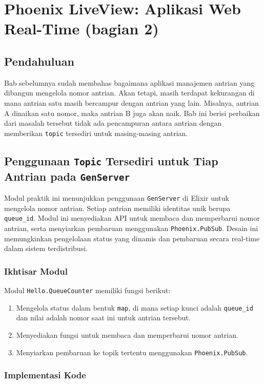 \chapter{Phoenix LiveView: Aplikasi Web Real-Time (bagian 2)}

\section{Pendahuluan}

Bab sebelumnya sudah membahas bagaimana aplikasi manajemen antrian yang dibangun mengelola nomor antrian. Akan tetapi, masih terdapat kekurangan di mana antrian satu masih bercampur dengan antrian yang lain. Misalnya, antrian A dinaikan satu nomor, maka antrian B juga akan naik. Bab ini berisi perbaikan dari masalah tersebut tidak ada pencampuran antara antrian dengan memberikan \texttt{topic} tersediri untuk masing-masing antrian.

\section{Penggunaan \texttt{Topic} Tersediri untuk Tiap Antrian pada \texttt{GenServer}}

Modul praktik ini menunjukkan penggunaan \texttt{GenServer} di Elixir untuk mengelola nomor antrian. Setiap antrian memiliki identitas unik berupa \texttt{queue\_id}. Modul ini menyediakan API untuk membaca dan memperbarui nomor antrian, serta menyiarkan pembaruan menggunakan \texttt{Phoenix.PubSub}. Desain ini memungkinkan pengelolaan status yang dinamis dan pembaruan secara real-time dalam sistem terdistribusi.

\subsection{Ikhtisar Modul}

Modul \texttt{Hello.QueueCounter} memiliki fungsi berikut:
\begin{enumerate}
	\item Mengelola status dalam bentuk \texttt{map}, di mana setiap kunci adalah \texttt{queue\_id} dan nilai adalah nomor saat ini untuk antrian tersebut.
	\item Menyediakan fungsi untuk membaca dan memperbarui nomor antrian.
	\item Menyiarkan pembaruan ke topik tertentu menggunakan \texttt{Phoenix.PubSub}.
\end{enumerate}

\subsection{Implementasi Kode}

